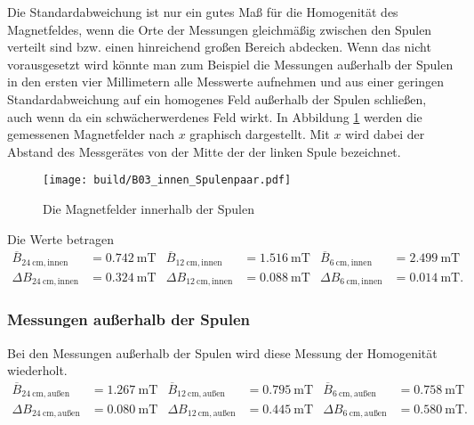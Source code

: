 Die Standardabweichung ist nur ein gutes Maß für die Homogenität des Magnetfeldes, 
wenn die Orte der Messungen gleichmäßig zwischen den Spulen verteilt sind bzw. einen hinreichend großen Bereich abdecken.
Wenn das nicht vorausgesetzt wird könnte man zum Beispiel die Messungen außerhalb der Spulen in den ersten vier Millimetern
alle Messwerte aufnehmen und aus einer geringen Standardabweichung auf ein homogenes Feld außerhalb der Spulen schließen,
auch wenn da ein schwächerwerdenes Feld wirkt.
%
%
In Abbildung \ref{fig:B03_innen} werden die gemessenen Magnetfelder nach $x$ graphisch dargestellt.
Mit $x$ wird dabei der Abstand des Messgerätes von der Mitte der der linken Spule bezeichnet.
\begin{figure}
    \centering
    \caption{Die Magnetfelder innerhalb der Spulen}
    \label{fig:B03_innen}
    \texttt{[image: build/B03\_innen\_Spulenpaar.pdf]}
\end{figure}
%
Die Werte betragen
\begin{align}
    \nonumber   
    \overline{B}_{\qty{24}{\centi\meter},\text{innen}}&= \qty[]{0.742}{\milli\tesla}      &
    \overline{B}_{\qty{12}{\centi\meter},\text{innen}}&= \qty[]{1.516}{\milli\tesla}     &
    \overline{B}_{\qty{6 }{\centi\meter},\text{innen}}&= \qty[]{2.499}{\milli\tesla}     \\
    \Delta B_{\qty{24}{\centi\meter},\text{innen}}&= \qty[]{0.324}{\milli\tesla}      &
    \Delta B_{\qty{12}{\centi\meter},\text{innen}}&= \qty[]{0.088}{\milli\tesla}      &
    \Delta B_{\qty{6 }{\centi\meter},\text{innen}}&= \qty[]{0.014}{\milli\tesla}.
    \label{erg:B03Standardabweichungen} 
\end{align}

\subsubsection{Messungen außerhalb der Spulen}
Bei den Messungen außerhalb der Spulen wird diese Messung der Homogenität wiederholt.
\begin{align}
    \nonumber   
    \overline{B}_{\qty{24}{\centi\meter},\text{außen}}&= \qty[]{1.267}{\milli\tesla}      &
    \overline{B}_{\qty{12}{\centi\meter},\text{außen}}&= \qty[]{0.795}{\milli\tesla}     &
    \overline{B}_{\qty{6 }{\centi\meter},\text{außen}}&= \qty[]{0.758}{\milli\tesla}     \\
    \Delta B_{\qty{24}{\centi\meter},\text{außen}}&= \qty[]{0.080}{\milli\tesla}      &
    \Delta B_{\qty{12}{\centi\meter},\text{außen}}&= \qty[]{0.445}{\milli\tesla}      &
    \Delta B_{\qty{6 }{\centi\meter},\text{außen}}&= \qty[]{0.580}{\milli\tesla}.
    \label{erg:B03Standardabweichungen_aussen} 
\end{align}